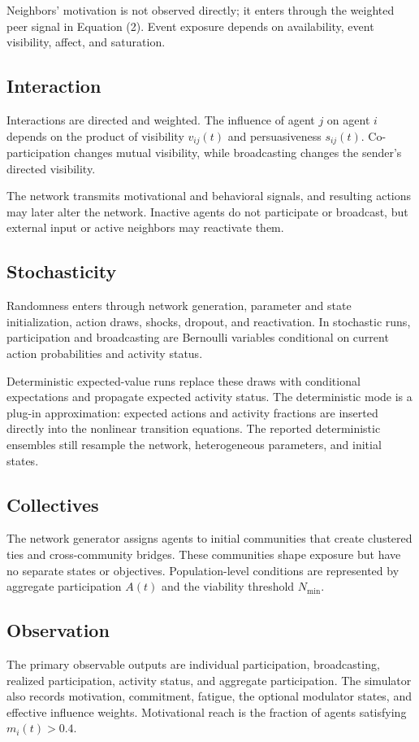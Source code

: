 \documentclass[11pt]{article}
\begin{document}
Neighbors’ motivation is not observed directly; it enters through the weighted peer signal in Equation (2). Event exposure depends on availability, event visibility, affect, and saturation. 

\subsection{Interaction}
Interactions are directed and weighted. The influence of agent $j$ on agent $i$ depends on the product of visibility $v_{ij}(t)$ and persuasiveness $s_{ij}(t)$. Co-participation changes mutual visibility, while broadcasting changes the sender’s directed visibility.

The network transmits motivational and behavioral signals, and resulting actions may later alter the network. Inactive agents do not participate or broadcast, but external input or active neighbors may reactivate them.

\subsection{Stochasticity}
Randomness enters through network generation, parameter and state initialization, action draws, shocks, dropout, and reactivation. In stochastic runs, participation and broadcasting are Bernoulli variables conditional on current action probabilities and activity status.

Deterministic expected-value runs replace these draws with conditional expectations and propagate expected activity status. The deterministic mode is a plug-in approximation: expected actions and activity fractions are inserted directly into the nonlinear transition equations. The reported deterministic ensembles still resample the network, heterogeneous parameters, and initial states.

\subsection{Collectives}
The network generator assigns agents to initial communities that create clustered ties and cross-community bridges. These communities shape exposure but have no separate states or objectives. Population-level conditions are represented by aggregate participation $A(t)$ and the viability threshold $N_{\min}$.

\subsection{Observation}
The primary observable outputs are individual participation, broadcasting, realized participation, activity status, and aggregate participation. The simulator also records motivation, commitment, fatigue, the optional modulator states, and effective influence weights. Motivational reach is the fraction of agents satisfying $m_i(t)>0.4$.
\end{document}
